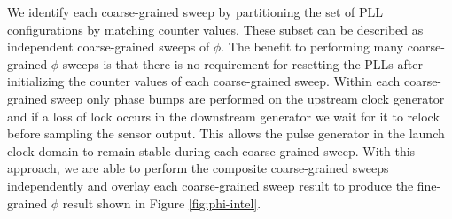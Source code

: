 We identify each coarse-grained sweep by partitioning the set of PLL configurations by matching counter values. These subset can be described as independent coarse-grained sweeps of $\phi$. The benefit to performing many coarse-grained $\phi$ sweeps is that there is no requirement for resetting the PLLs after initializing the counter values of each coarse-grained sweep. Within each coarse-grained sweep only phase bumps are performed on the upstream clock generator and if a loss of lock occurs in the downstream generator we wait for it to relock before sampling the sensor output. This allows the pulse generator in the launch clock domain to remain stable during each coarse-grained sweep. With this approach, we are able to perform the composite coarse-grained sweeps independently and overlay each coarse-grained sweep result to produce the fine-grained $\phi$ result shown in Figure \ref{fig:phi-intel}.

